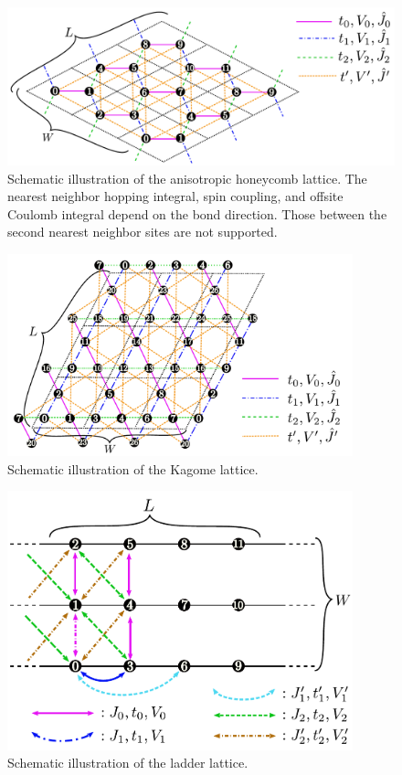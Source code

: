 \begin{itemize}
\begin{figure}[!tbhp]
  \begin{center}
    \includegraphics[width=15cm]{../figs/chap04_1_honeycomb.pdf}
    \caption{Schematic illustration of the anisotropic honeycomb lattice.
      The nearest neighbor 
      hopping integral, spin coupling, and offsite Coulomb integral
      depend on the bond direction.
      Those between the second nearest neighbor sites are not supported.
    }
    \label{fig_chap04_1_honeycomb}
  \end{center}
\end{figure}

\begin{figure}[!tbhp]
  \begin{center}
    \includegraphics[width=10cm]{../figs/kagome.pdf}
    \caption{Schematic illustration of the Kagome lattice.
    }
    \label{fig_kagome}
  \end{center}
\end{figure}

\begin{figure}[!tbhp]
  \begin{center}
    \includegraphics[width=10cm]{../figs/ladder.pdf}
    \caption{Schematic illustration of the ladder lattice.
    }
    \label{fig_ladder}
  \end{center}
\end{figure}



\end{itemize}
